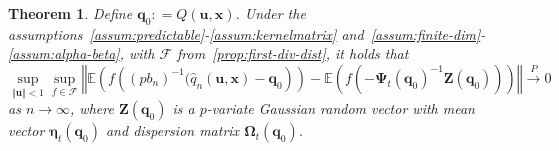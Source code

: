 \documentclass[aos]{imsart}
\theoremstyle{plain}
\newtheorem{theorem}{Theorem}[section]
\theoremstyle{remark}
\def\E{\mathbb{E}}
\newcommand{\bb}[1]{\boldsymbol{#1}}
\newcommand{\cnam}[1]{\textcolor{mypurple}{#1}}
\begin{document}
\begin{theorem}\label{thm:normal-dist}
    Define $\bb{q}_0: = Q(\bb{u}, \bb{x})$. \cnam{Under} the assumptions~\ref{assum:predictable}-\ref{assum:kernelmatrix} and~\ref{assum:finite-dim}-\ref{assum:alpha-beta}, with $\mathcal{F}$ from~\ref{prop:first-div-dist}, it holds that
    \begin{equation*}
        \sup_{\Vert \bb{u} \Vert < 1} \sup_{f \in \mathcal{F}} \left\Vert \E\left(f \left((pb_n)^{-1} (\widehat{q}_n(\bb{u},\bb{x}) - \bb{q}_0 \right)\right) - \E\left( f\left( -\bb{\Psi}_t(\bb{q}_0)^{-1}\bb{Z}(\bb{q}_0) \right) \right) \right\Vert \xrightarrow{P} 0 
    \end{equation*}
    \noindent as $n \rightarrow \infty$, where  $\bb{Z}(\bb{q}_0)$ is a $p$-variate Gaussian random vector with mean vector $\bb{\eta}_t(\bb{q}_0)$ and dispersion matrix $\bb{\Omega}_t(\bb{q}_0)$.
\end{theorem}
\end{document}
